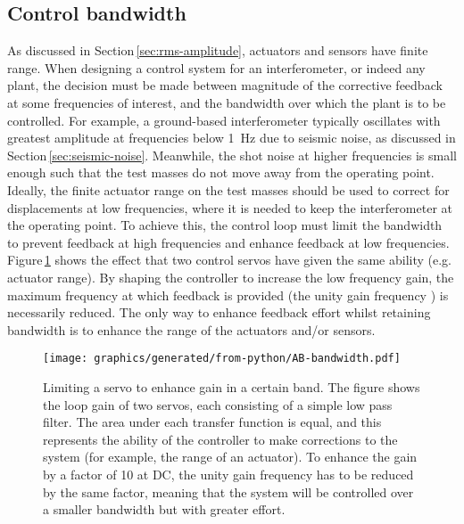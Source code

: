\subsection{Control bandwidth}
As discussed in Section\,\ref{sec:rms-amplitude}, actuators and sensors have finite range. When designing a control system for an interferometer, or indeed any plant, the decision must be made between magnitude of the corrective feedback at some frequencies of interest, and the bandwidth over which the plant is to be controlled. For example, a ground-based interferometer typically oscillates with greatest amplitude at frequencies below \SI{1}{\hertz} due to seismic noise, as discussed in Section\,\ref{sec:seismic-noise}. Meanwhile, the shot noise at higher frequencies is small enough such that the test masses do not move away from the operating point. Ideally, the finite actuator range on the test masses should be used to correct for displacements at low frequencies, where it is needed to keep the interferometer at the operating point. To achieve this, the control loop must limit the bandwidth to prevent feedback at high frequencies and enhance feedback at low frequencies. Figure\,\ref{fig:bandwidth} shows the effect that two control servos have given the same ability (e.g. actuator range). By shaping the controller to increase the low frequency gain, the maximum frequency at which feedback is provided (the unity gain frequency ) is necessarily reduced. The only way to enhance feedback effort whilst retaining bandwidth is to enhance the range of the actuators and/or sensors.

\begin{figure}
  \centering
  \texttt{[image: graphics/generated/from-python/AB-bandwidth.pdf]}
  \caption[Limiting a servo to enhance gain in a certain band]{\label{fig:bandwidth}Limiting a servo to enhance gain in a certain band. The figure shows the loop gain of two servos, each consisting of a simple low pass filter. The area under each transfer function is equal, and this represents the ability of the controller to make corrections to the system (for example, the range of an actuator). To enhance the gain by a factor of \num{10} at \gls{DC}, the unity gain frequency has to be reduced by the same factor, meaning that the system will be controlled over a smaller bandwidth but with greater effort.}
\end{figure}

